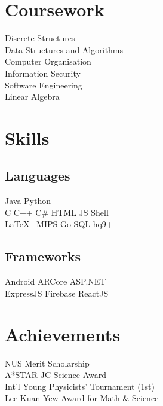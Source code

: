 \documentclass[]{deedy-resume-openfont}
\begin{document}
\begin{minipage}[t]{0.33\textwidth}

\section{Coursework}
Discrete Structures \\
Data Structures and Algorithms \\
Computer Organisation \\
Information Security \\
Software Engineering \\
Linear Algebra
\sectionsep



\section{Skills}
\subsection{Languages}
Java \textbullet{} Python \\ 
C \textbullet{} C++ \textbullet{} C\# \textbullet{} HTML \textbullet{} JS \textbullet{} Shell \\
\LaTeX\ \textbullet{} MIPS \textbullet{} Go \textbullet{} SQL \textbullet{} hq9+
\sectionsep

\subsection{Frameworks}
Android \textbullet{} ARCore \textbullet{} ASP.NET \\
ExpressJS \textbullet{} Firebase \textbullet{} ReactJS


\section{Achievements}
NUS Merit Scholarship \\
A*STAR JC Science Award \\
Int'l Young Physicists' Tournament (1st) \\
Lee Kuan Yew Award for Math \& Science \\



\end{minipage}
\end{document}
